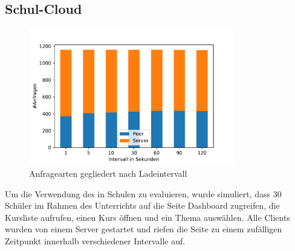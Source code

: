 

\subsection{Schul-Cloud}
\begin{figure}[!h]
	\centering
	\includegraphics[width=0.8\textwidth]{figures/sc_stacked_interval}
	\caption[A Figure Short-Title]{Anfragearten gegliedert nach Ladeintervall}
	\label{fig:sc_stacked_interval}
\end{figure}
Um die Verwendung des \cdns in Schulen zu evaluieren, wurde simuliert, dass 30 Schüler im Rahmen des Unterrichts auf die Seite Dashboard  zugreifen, die Kursliste aufrufen, einen Kurs öffnen und ein Thema auswählen. Alle Clients wurden von einem Server gestartet und riefen die Seite zu einem zufälligen Zeitpunkt innerhalb verschiedener Intervalle auf. 

